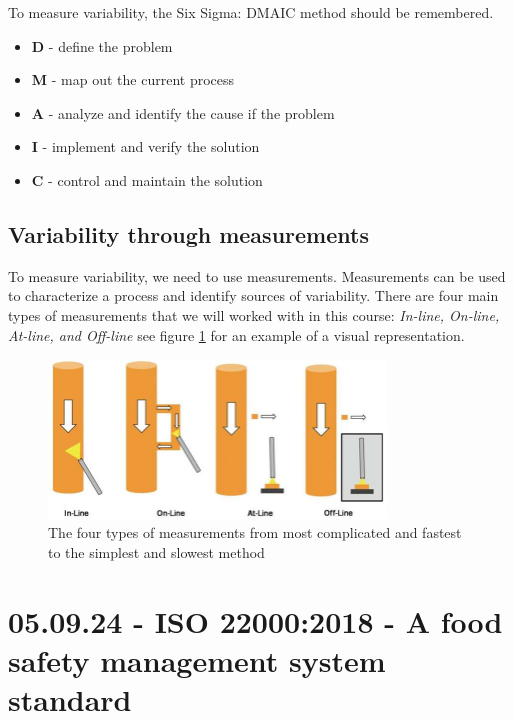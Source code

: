 To measure variability, the Six Sigma: DMAIC method should be remembered. 
\begin{highlight}
    \begin{itemize}
        \item \textbf{D} - define the problem
        \item \textbf{M} - map out the current process
        \item \textbf{A} - analyze and identify the cause if the problem
        \item \textbf{I} - implement and verify the solution
        \item \textbf{C} - control and maintain the solution
    \end{itemize}
\end{highlight}

\subsection{Variability through measurements}
To measure variability, we need to use measurements. Measurements can be used to characterize a process and identify sources of variability. There are four main types of measurements that we will worked with in this course: \textit{In-line, On-line, At-line, and Off-line} see figure \ref*{fig:measurements} for an example of a visual representation.

\begin{figure}[h]
    \centering
    \includegraphics[width=0.8\textwidth]{Figures/Meassurments.JPG}
    \caption{The four types of measurements from most complicated and fastest to the simplest and slowest method}
    \label{fig:measurements}
\end{figure}

\section{05.09.24 - ISO 22000:2018 - A food safety management system standard}


